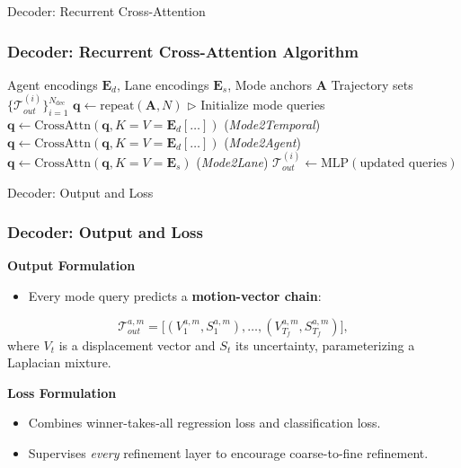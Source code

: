 \documentclass[10pt,aspectratio=169]{beamer}
\begin{document}
\begin{frame}[fragile]{Decoder: Recurrent Cross-Attention}
    \frametitle{Decoder: Recurrent Cross-Attention Algorithm}
    \begin{algorithmic}[1]
    \scriptsize
    \Require Agent encodings \(\mathbf{E}_d\), Lane encodings \(\mathbf{E}_s\), Mode anchors \(\mathbf{A}\)
    \Ensure Trajectory sets \(\{\mathcal{T}_{out}^{(i)}\}_{i=1}^{N_{\text{dec}}}\)
    \State \(\mathbf{q} \leftarrow \text{repeat}(\mathbf{A}, N)\) \(\triangleright\) Initialize mode queries
            \State \(\mathbf{q}\leftarrow \text{CrossAttn}(\mathbf{q}, K=V=\mathbf{E}_d[\dots])\) \quad (\textit{Mode2Temporal})
            \State \(\mathbf{q}\leftarrow \text{CrossAttn}(\mathbf{q}, K=V=\mathbf{E}_d[\dots])\) \quad (\textit{Mode2Agent})
            \State \(\mathbf{q}\leftarrow \text{CrossAttn}(\mathbf{q}, K=V=\mathbf{E}_s)\) \quad (\textit{Mode2Lane})
        \EndFor
        \State \(\mathcal{T}_{out}^{(i)} \leftarrow \text{MLP}(\text{updated queries})\)
    \EndFor
    \end{algorithmic}
\end{frame}

\begin{frame}{Decoder: Output and Loss}
    \frametitle{Decoder: Output and Loss}
    \textbf{Output Formulation}
    \begin{itemize}
        \item Every mode query predicts a \textbf{motion-vector chain}:
    \end{itemize}
    \begin{equation}
    \mathcal{T}_{out}^{a,m} = \bigl[(V_1^{a,m},S_1^{a,m}),\dots,(V_{T_f}^{a,m},S_{T_f}^{a,m})\bigr],
    \end{equation}
    where \(V_t\) is a displacement vector and \(S_t\) its uncertainty, parameterizing a Laplacian mixture.

    \vspace{1em}
    \textbf{Loss Formulation}
    \begin{itemize}
        \item Combines winner-takes-all regression loss and classification loss.
        \item Supervises \emph{every} refinement layer to encourage coarse-to-fine refinement.
    \end{itemize}
\end{frame}
\end{document}
